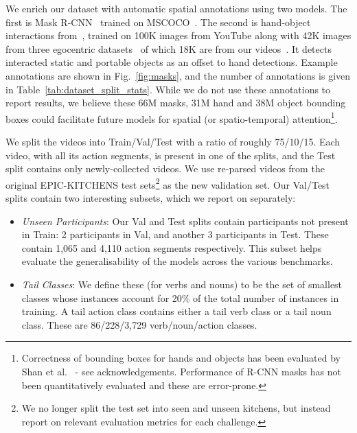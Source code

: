\documentclass[twocolumn]{svjour3}          \smartqed
\newcommand{\chParagraph}[1]{\noindent {\textbf{#1.}} \hspace{6pt}}
\begin{document}
We enrich our dataset with automatic spatial annotations using two models. The first is Mask R-CNN~\cite{he2017mask} trained on MSCOCO~\cite{coco}. The second is hand-object interactions from~\cite{Shan2020Understanding}, trained on 100K images from YouTube along with 42K images from three egocentric datasets~\cite{Damen2018EPICKITCHENS,sigurdsson2018charadesego,EGTEA} of which 18K are from our videos~\cite{Damen2018EPICKITCHENS}. It detects interacted static and portable objects as an offset to hand detections.
Example annotations are shown in
Fig.~\ref{fig:masks}, and the number of annotations is given in Table~\ref{tab:dataset_split_stats}.
While we do not use these annotations to report results, we believe these 66M masks, 31M hand and 38M object bounding boxes could facilitate future models for spatial (or spatio-temporal) attention\footnote{Correctness of bounding boxes for hands and objects has been evaluated by Shan et al.~\cite{Shan2020Understanding} - see acknowledgements. Performance of R-CNN masks has not been quantitatively evaluated and these are error-prone.}.





\chParagraph{Splits}
We split the videos into Train/Val/Test with a ratio of roughly 75/10/15. Each video, with all its action segments, is present in one of the splits, and the  
Test split contains only newly-collected videos.
We use re-parsed videos from the original EPIC-KITCHENS test sets\footnote{We no longer split the test set into seen and unseen kitchens, but instead report on relevant evaluation metrics for each challenge.} as the new validation set.
Our Val/Test splits contain two interesting subsets, which we report on separately:
\begin{itemize}[leftmargin=*,itemsep=-2ex,partopsep=1ex,parsep=2ex]
    \item \emph{Unseen Participants}: Our Val and Test splits contain participants not present in Train: 2 participants in Val, and another 3 participants in Test. These contain 1,065 and 4,110 action segments respectively.
    This subset helps evaluate the generalisability of the models across the various benchmarks.
    \item \emph{Tail Classes}: We define these (for verbs and nouns) to be the set of smallest classes whose instances account for 20\% of the total number of instances in training.
A tail action class contains either a tail verb class or a tail noun class.
These are 86/228/3,729 verb/noun/action classes. 

\end{itemize}
\end{document}
